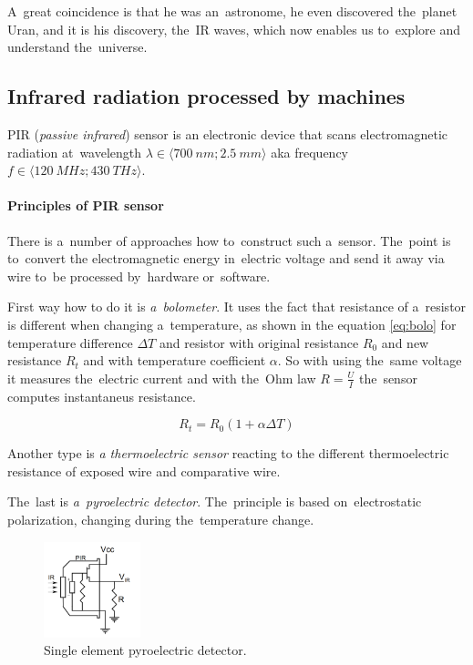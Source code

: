 A~great coincidence is that he was an~astronome, he even discovered the~planet Uran, and it is his discovery,
the~IR waves, which now enables us to~explore and understand the~universe. \cite{NasaIrVideo}



\subsection*{Infrared radiation processed by machines}
\label{IRsensing}
PIR ({\it passive infrared}) sensor is an electronic device that scans electromagnetic
radiation at~wavelength $\lambda\in \langle 700~nm;2.5~mm \rangle$ aka frequency $f\in \langle 120~MHz;430~THz \rangle$. \cite{an2105}

\paragraph{Principles of PIR sensor}
There is a~number of approaches how to~construct such a~sensor. The~point is to~convert the electromagnetic
energy in~electric voltage and send it away via wire to~be processed by~hardware or~software.

First way how to do it is {\it a~bolometer}. It uses the fact that resistance of a~resistor is different
when changing a~temperature, as shown in the equation \ref{eq:bolo} for temperature difference $\Delta T$
and resistor with original resistance $R_0$ and new resistance $R_t$ and with temperature coefficient $\alpha$.
So with using the~same voltage it measures the~electric current and with the~Ohm law $R = \frac{U}{I}$
the~sensor computes instantaneus resistance.

\begin{equation}
\label{eq:bolo}
R_t = R_0 (1 + \alpha\Delta T)
\end{equation}

Another type is {\it a thermoelectric sensor} reacting to the different thermoelectric resistance of
exposed wire and comparative wire.

The~last is {\it a~pyroelectric detector}. The~principle is based on~electrostatic polarization,
changing during the~temperature change. \cite{DetectorsBook}

\begin{figure}[h!]
\begin{center}
\includegraphics[width=0.25\textwidth]{img/pirscheme.png}
\caption{Single element pyroelectric detector.\cite{an2105}\label{fig:pir}}
\end{center}    
\end{figure}


